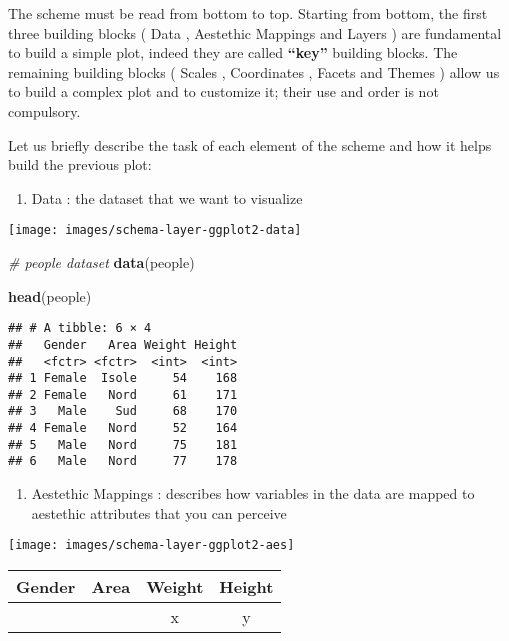 \documentclass[]{book}
\newenvironment{Shaded}{\begin{snugshade}}{\end{snugshade}}
\newcommand{\KeywordTok}[1]{\textcolor[rgb]{0.13,0.29,0.53}{\textbf{{#1}}}}
\newcommand{\CommentTok}[1]{\textcolor[rgb]{0.56,0.35,0.01}{\textit{{#1}}}}
\newcommand{\NormalTok}[1]{{#1}}
\providecommand{\tightlist}{%
  \setlength{\itemsep}{0pt}\setlength{\parskip}{0pt}}
\def\tightlist{}
\begin{document}
The scheme must be read from bottom to top. Starting from bottom, the
first three building blocks ( {Data} , {Aestethic Mappings} and {Layers}
) are fundamental to build a simple plot, indeed they are called
\textbf{``key''} building blocks. The remaining building blocks (
{Scales} , {Coordinates} , {Facets} and {Themes} ) allow us to build a
complex plot and to customize it; their use and order is not compulsory.

Let us briefly describe the task of each element of the scheme and how
it helps build the previous plot:

\begin{enumerate}
\def\labelenumi{\arabic{enumi}.}
\tightlist
\item
   {Data} : the dataset that we want to visualize
\end{enumerate}

\texttt{[image: images/schema-layer-ggplot2-data]}

\begin{Shaded}
\begin{Highlighting}[]
\CommentTok{# people dataset}
\KeywordTok{data}\NormalTok{(people)}
\end{Highlighting}
\end{Shaded}

\begin{Shaded}
\begin{Highlighting}[]
\KeywordTok{head}\NormalTok{(people)}
\end{Highlighting}
\end{Shaded}

\begin{verbatim}
## # A tibble: 6 × 4
##   Gender   Area Weight Height
##   <fctr> <fctr>  <int>  <int>
## 1 Female  Isole     54    168
## 2 Female   Nord     61    171
## 3   Male    Sud     68    170
## 4 Female   Nord     52    164
## 5   Male   Nord     75    181
## 6   Male   Nord     77    178
\end{verbatim}

\begin{enumerate}
\def\labelenumi{\arabic{enumi}.}
\setcounter{enumi}{1}
\tightlist
\item
   {Aestethic Mappings} : describes how variables in the data are mapped
  to aestethic attributes that you can perceive
\end{enumerate}

\texttt{[image: images/schema-layer-ggplot2-aes]}

\begin{longtable}[]{@{}llcc@{}}
\toprule
Gender & Area & Weight & Height\tabularnewline
\midrule
\endhead
& & x & y\tabularnewline
\bottomrule
\end{longtable}
\end{document}
